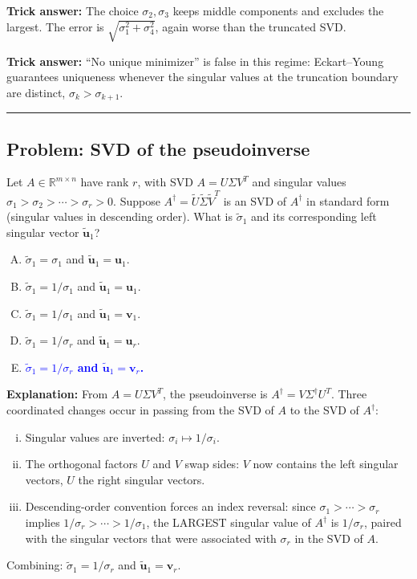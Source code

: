 \documentclass[12pt]{amsart}
\newcommand{\divider}{
  \vspace{-1em}
  \noindent
  \raisebox{-0.15ex}{\textbullet}%
  \hspace{0.5em}%
  \rule[0.5ex]{0.95\textwidth}{1.0pt}%
  \hspace{0.5em}%
  \raisebox{-0.15ex}{\textbullet}%
  \vspace{0em}
}
\begin{document}
\textbf{Trick answer:}
The choice $\sigma_2, \sigma_3$ keeps middle components and excludes the
largest. The error is $\sqrt{\sigma_1^2 + \sigma_4^2}$, again worse than the
truncated SVD.

\textbf{Trick answer:}
``No unique minimizer'' is false in this regime: Eckart--Young guarantees
uniqueness whenever the singular values at the truncation boundary are
distinct, $\sigma_k > \sigma_{k+1}$.

\divider

\subsection*{Problem: SVD of the pseudoinverse}

Let $A \in \mathbb{R}^{m \times n}$ have rank $r$, with SVD $A = U\Sigma V^T$
and singular values $\sigma_1 > \sigma_2 > \cdots > \sigma_r > 0$.
Suppose $A^\dagger = \tilde U \tilde\Sigma \tilde V^T$ is an SVD of
$A^\dagger$ in standard form (singular values in descending order).
What is $\tilde\sigma_1$ and its corresponding left singular vector
$\tilde{\mathbf{u}}_1$?

\begin{enumerate}[(A)]
\item $\tilde\sigma_1 = \sigma_1$ and $\tilde{\mathbf{u}}_1 = \mathbf{u}_1$.
\item $\tilde\sigma_1 = 1/\sigma_1$ and $\tilde{\mathbf{u}}_1 = \mathbf{u}_1$.
\item $\tilde\sigma_1 = 1/\sigma_1$ and $\tilde{\mathbf{u}}_1 = \mathbf{v}_1$.
\item $\tilde\sigma_1 = 1/\sigma_r$ and $\tilde{\mathbf{u}}_1 = \mathbf{u}_r$.
\item \textcolor{blue}{\textbf{$\tilde\sigma_1 = 1/\sigma_r$ and $\tilde{\mathbf{u}}_1 = \mathbf{v}_r$.}}
\end{enumerate}

\textbf{Explanation:}
From $A = U\Sigma V^T$, the pseudoinverse is $A^\dagger = V\Sigma^\dagger U^T$.
Three coordinated changes occur in passing from the SVD of $A$ to the SVD
of $A^\dagger$:
\begin{enumerate}[(i)]
\item Singular values are inverted: $\sigma_i \mapsto 1/\sigma_i$.
\item The orthogonal factors $U$ and $V$ swap sides: $V$ now contains the
left singular vectors, $U$ the right singular vectors.
\item Descending-order convention forces an index reversal: since
$\sigma_1 > \cdots > \sigma_r$ implies $1/\sigma_r > \cdots > 1/\sigma_1$,
the LARGEST singular value of $A^\dagger$ is $1/\sigma_r$, paired with
the singular vectors that were associated with $\sigma_r$ in the SVD of $A$.
\end{enumerate}
Combining: $\tilde\sigma_1 = 1/\sigma_r$ and $\tilde{\mathbf{u}}_1 = \mathbf{v}_r$.
\end{document}
